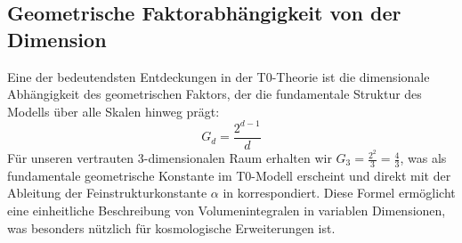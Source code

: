 \subsection{Geometrische Faktorabhängigkeit von der Dimension}
\label{subsec:geometric_factor}
Eine der bedeutendsten Entdeckungen in der T0-Theorie ist die dimensionale Abhängigkeit des geometrischen Faktors, der die fundamentale Struktur des Modells über alle Skalen hinweg prägt:
\begin{equation}
	G_d = \frac{2^{d-1}}{d}
\end{equation}
Für unseren vertrauten 3-dimensionalen Raum erhalten wir $G_3 = \frac{2^2}{3} = \frac{4}{3}$, was als fundamentale geometrische Konstante im T0-Modell erscheint und direkt mit der Ableitung der Feinstrukturkonstante $\alpha$ in \cite{T0_Feinstruktur} korrespondiert. Diese Formel ermöglicht eine einheitliche Beschreibung von Volumenintegralen in variablen Dimensionen, was besonders nützlich für kosmologische Erweiterungen ist.
\begin{table}[htbp]
	\centering
	\caption{Geometrische Faktoren für verschiedene Dimensionalitäten, erweitert um Anwendungsbeispiele}
	\label{tab:geometric_factors}
\end{table}
